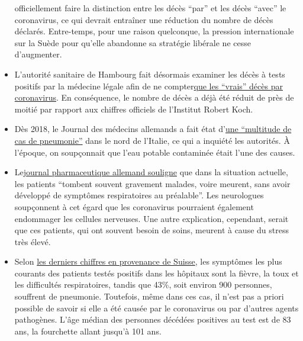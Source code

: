 \begin{itemize}
  officiellement faire la distinction entre les décès ``par'' et les
  décès ``avec'' le coronavirus, ce qui devrait entraîner une réduction
  du nombre de décès déclarés. Entre-temps, pour une raison quelconque,
  la pression internationale sur la Suède pour qu'elle abandonne sa
  stratégie libérale ne cesse d'augmenter.
\item
  L'autorité sanitaire de Hambourg fait désormais examiner les décès à
  tests positifs par la médecine légale afin de ne
  compter\href{https://www.t-online.de/nachrichten/deutschland/id_87636856/coronavirus-hamburg-will-nur-echte-covid-19-tote-zaehlen.html}{que
  les ``vrais'' décès par coronavirus}. En conséquence, le nombre de
  décès a déjà été réduit de près de moitié par rapport aux chiffres
  officiels de l'Institut Robert Koch.
\item
  Dès 2018, le Journal des médecins allemands a fait état
  d'\href{https://www.aerzteblatt.de/nachrichten/97750/Vielzahl-an-Lungenentzuendungen-beunruhigen-Behoerden-in-Norditalien}{une
  ``multitude de cas de pneumonie''} dans le nord de l'Italie, ce qui a
  inquiété les autorités. À l'époque, on soupçonnait que l'eau potable
  contaminée était l'une des causes.
\item
  Le\href{https://www.pharmazeutische-zeitung.de/atemstillstand-koennte-auch-zentrale-ursache-haben-116664/}{journal
  pharmaceutique allemand souligne} que dans la situation actuelle, les
  patients ``tombent souvent gravement malades, voire meurent, sans
  avoir développé de symptômes respiratoires au préalable''. Les
  neurologues soupçonnent à cet égard que les coronavirus pourraient
  également endommager les cellules nerveuses. Une autre explication,
  cependant, serait que ces patients, qui ont souvent besoin de soins,
  meurent à cause du stress très élevé.
\item
  Selon
  \href{https://www.bag.admin.ch/dam/bag/de/dokumente/mt/k-und-i/aktuelle-ausbrueche-pandemien/2019-nCoV/covid-19-lagebericht.pdf.download.pdf/COVID-19_Epidemiologische_Lage_Schweiz.pdf}{les
  derniers chiffres en provenance de Suisse}, les symptômes les plus
  courants des patients testés positifs dans les hôpitaux sont la
  fièvre, la toux et les difficultés respiratoires, tandis que 43\%,
  soit environ 900 personnes, souffrent de pneumonie. Toutefois, même
  dans ces cas, il n'est pas a priori possible de savoir si elle a été
  causée par le coronavirus ou par d'autres agents pathogènes. L'âge
  médian des personnes décédées positives au test est de 83 ans, la
  fourchette allant jusqu'à 101 ans.

\end{itemize}
